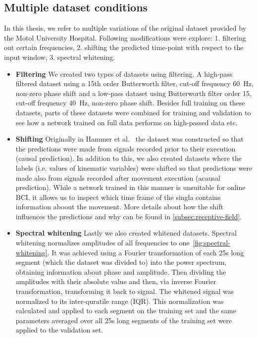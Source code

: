 \subsection{Multiple dataset conditions}\label{subsec:modifications-to-the-dataset}
In this thesis, we refer to multiple variations of the original dataset provided by the Motol University Hospital.
Following modifications were explore: 1. filtering out certain frequencies, 2. shifting the predicted time-point with respect to the input window, 3. spectral whitening.
\begin{itemize}
\item \textbf{Filtering} We created two types of datasets using filtering.
A high-pass filtered dataset using a 15th order Butterworth filter, cut-off frequency 60~Hz, non-zero phase shift and a low-pass dataset using Butterworth filter order 15, cut-off frequency 40~Hz, non-zero phase shift. Besides full training on these datasets, parts of these datasets were combined for training and validation to see how a network trained on full data performs on high-passed data etc.
\\

\item \textbf{Shifting} Originally in Hammer et al.~\cite{Hammer-2021} the dataset was constructed so that the predictions were made from signals recorded prior to their execution (causal prediction).
In addition to this, we also created datasets where the labels (i.e. values of kinematic variables) were shifted so that predictions were made also from signals recorded after movement execution (acausal prediction).
While a network trained in this manner is unsuitable for online BCI, it allows us to inspect which time frame of the singla contains information aboout the movement.
More details about how the shift influences the predictions and why can be found in \ref{subsec:receptive-field}. \\

\item \textbf{Spectral whitening} Lastly we also created whitened datasets.
Spectral whitening normalizes amplitudes of all frequencies to one~\ref{fig:spectral-whitening}.
It was achieved using a Fourier transformation of each 25s long segment (which the dataset was divided to) into the power spectrum, obtaining information about phase and amplitude.
Then dividing the amplitudes with their absolute value and then, via inverse Fourier transformation, transforming it back to signal.
The whitened signal was normalized to its inter-quratile range (IQR).
This normalization was calculated and applied to each segment on the training set and the same parameters averaged over all 25s long segments of the training set were applied to the validation set.
\end{itemize}

